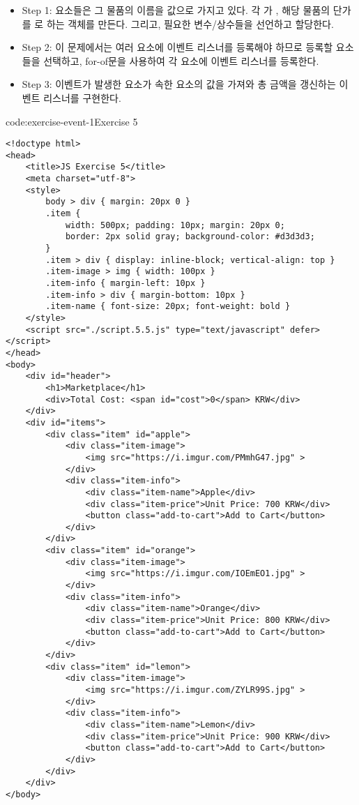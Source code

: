 \begin{itemize}
    \item Step 1:  요소들은 그 물품의 이름을  값으로 가지고 있다. 각 가 , 해당 물품의 단가를 로 하는 객체를 만든다. 그리고, 필요한 변수/상수들을 선언하고 할당한다.
    \item Step 2: 이 문제에서는 여러 요소에 이벤트 리스너를 등록해야 하므로 등록할 요소들을 선택하고, for-of문을 사용하여 각 요소에 이벤트 리스너를 등록한다.
    \item Step 3: 이벤트가 발생한 요소가 속한  요소의  값을 가져와 총 금액을 갱신하는 이벤트 리스너를 구현한다.
\end{itemize}
\newpage

\begin{codeenv}{code:exercise-event-1}{Exercise 5}\begin{verbatim}
<!doctype html>
<head>
    <title>JS Exercise 5</title>
    <meta charset="utf-8">
    <style>
        body > div { margin: 20px 0 }
        .item {
            width: 500px; padding: 10px; margin: 20px 0;
            border: 2px solid gray; background-color: #d3d3d3;
        }
        .item > div { display: inline-block; vertical-align: top }
        .item-image > img { width: 100px }
        .item-info { margin-left: 10px }
        .item-info > div { margin-bottom: 10px }
        .item-name { font-size: 20px; font-weight: bold }
    </style>
    <script src="./script.5.5.js" type="text/javascript" defer></script>
</head>
<body>
    <div id="header">
        <h1>Marketplace</h1>
        <div>Total Cost: <span id="cost">0</span> KRW</div>
    </div>
    <div id="items">
        <div class="item" id="apple">
            <div class="item-image">
                <img src="https://i.imgur.com/PMmhG47.jpg" >
            </div>
            <div class="item-info">
                <div class="item-name">Apple</div>
                <div class="item-price">Unit Price: 700 KRW</div>
                <button class="add-to-cart">Add to Cart</button>
            </div>
        </div>
        <div class="item" id="orange">
            <div class="item-image">
                <img src="https://i.imgur.com/IOEmEO1.jpg" >
            </div>
            <div class="item-info">
                <div class="item-name">Orange</div>
                <div class="item-price">Unit Price: 800 KRW</div>
                <button class="add-to-cart">Add to Cart</button>
            </div>
        </div>
        <div class="item" id="lemon">
            <div class="item-image">
                <img src="https://i.imgur.com/ZYLR99S.jpg" >
            </div>
            <div class="item-info">
                <div class="item-name">Lemon</div>
                <div class="item-price">Unit Price: 900 KRW</div>
                <button class="add-to-cart">Add to Cart</button>
            </div>
        </div>
    </div>
</body>
\end{verbatim}
\end{codeenv}

